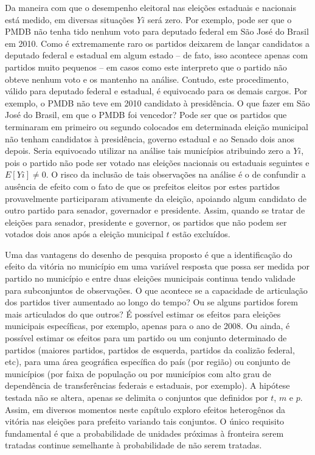 Da maneira com que o desempenho eleitoral nas eleições estaduais e nacionais está medido, em diversas situações $Y{i}$ será zero. Por exemplo, pode ser que o PMDB não tenha tido nenhum voto para deputado federal em São José do Brasil em 2010. Como é extremamente raro os partidos deixarem de lançar candidatos a deputado federal e estadual em algum estado -- de fato, isso acontece apenas com partidos muito pequenos -- em casos como este interpreto que o partido não obteve nenhum voto e os mantenho na análise. Contudo, este procedimento, válido para deputado federal e estadual, é equivocado para os demais cargos. Por exemplo, o PMDB não teve em 2010 candidato à presidência. O que fazer em São José do Brasil, em que o PMDB foi vencedor? Pode ser que os partidos que terminaram em primeiro ou segundo colocados em determinada eleição municipal não tenham candidatos à presidência, governo estadual e ao Senado dois anos depois. Seria equivocado utilizar na análise tais municípios atribuindo zero a $Y{i}$, pois o partido não pode ser votado nas eleições nacionais ou estaduais seguintes e $E[Y{i}] \ne 0$. O risco da inclusão de tais observações na análise é o de confundir a ausência de efeito com o fato de que os prefeitos eleitos por estes partidos provavelmente participaram ativamente da eleição, apoiando algum candidato de outro partido para senador, governador e presidente. Assim, quando se tratar de eleições para senador, presidente e governor, os partidos que não podem ser votados dois anos após a eleição municipal $t$ estão excluídos.

Uma das vantagens do desenho de pesquisa proposto é que a identificação do efeito da vitória no município em uma variável resposta que possa ser medida por partido no município e entre duas eleições municipais continua tendo validade para subconjuntos de observações. O que acontece se a capacidade de articulação dos partidos tiver aumentado ao longo do tempo? Ou se alguns partidos forem mais articulados do que outros? É possível estimar os efeitos para eleições municipais específicas, por exemplo, apenas para o ano de 2008. Ou ainda, é possível estimar os efeitos para um partido ou um conjunto determinado de partidos (maiores partidos, partidos de esquerda, partidos da coalizão federal, etc), para uma área geográfica específica do país (por região) ou conjunto de municípios (por faixa de população ou por municípios com alto grau de dependência de transferências federais e estaduais, por exemplo). A hipótese testada não se altera, apenas se delimita o conjuntos que definidos por $t$, $m$ e $p$. Assim, em diversos momentos neste capítulo exploro efeitos heterogênos da vitória nas eleições para prefeito variando tais conjuntos. O único requisito fundamental é que a probabilidade de unidades próximas à fronteira serem tratadas continue semelhante à probabilidade de não serem tratadas.

